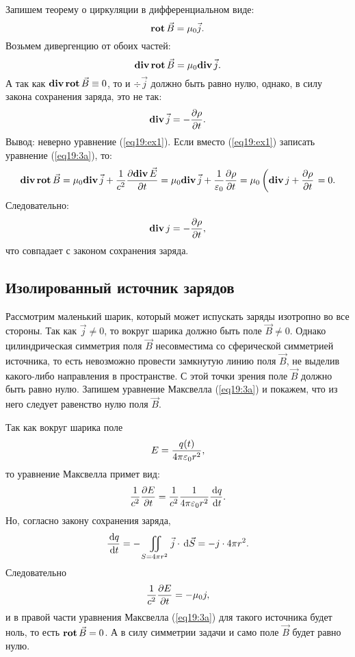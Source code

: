         Запишем теорему о циркуляции в дифференциальном виде:
        \begin{equation}
            \mathbf{rot\,}\vec{B} = \mu_0\vec{j}.
            \label{eq19:ex1}
        \end{equation}
        Возьмем дивергенцию от обоих частей:
        \[
            \mathbf{div\,}\mathbf{rot\,}\vec{B} = \mu_0\mathbf{div\,}\vec{j}.
        \]
        А так как \( \mathbf{div\,}\mathbf{rot\,}\vec{B} \equiv 0 \), то и \( \div\vec{j} \) должно
        быть равно нулю, однако, в силу закона сохранения заряда, это не так:
        \[
            \mathbf{div\,}\vec{j} = -\frac{\partial \rho}{\partial t}.
        \]
        Вывод: неверно уравнение (\ref{eq19:ex1}). Если вместо (\ref{eq19:ex1})
        записать уравнение (\ref{eq19:3a}), то:
        \[
            \mathbf{div\,}\mathbf{rot\,}\vec{B} = \mu_0\mathbf{div\,}\vec{j} +
            \frac{1}{c^2}\frac{\partial \mathbf{div\,}\vec{E}}{\partial t} = \mu_0\mathbf{div\,}\vec{j} +
            \frac{1}{\varepsilon_0}\frac{\partial \rho}{\partial t} = \mu_0\left(\mathbf{div\,}{j} +
            \frac{\partial \rho}{\partial t}\right. = 0.
        \]
        Следовательно:
        \[
            \mathbf{div\,}{j} = -\frac{\partial \rho}{\partial t},
        \]
        что совпадает с законом сохранения заряда.

    \subsection{Изолированный источник зарядов}

        Рассмотрим маленький шарик, который может испускать заряды изотропно во
        все стороны. Так как \( \vec{j} \ne 0 \), то вокруг шарика должно быть
        поле \( \vec{B} \ne 0 \). Однако цилиндрическая симметрия поля
        \( \vec{B} \) несовместима со сферической симметрией источника, то есть
        невозможно провести замкнутую линию поля \( \vec{B} \), не выделив
        какого-либо направления в пространстве. С этой точки зрения поле
        \( \vec{B} \) должно быть равно нулю. Запишем уравнение Максвелла
        (\ref{eq19:3a}) и покажем, что из него следует равенство нулю поля
        \( \vec{B} \).
        
        Так как вокруг шарика поле
        \[
            E = \frac{q(t)}{4\pi\varepsilon_0 r^2},
        \]
        то уравнение Максвелла примет вид:
        \[
            \frac{1}{c^2}\frac{\partial E}{\partial t} =
            \frac{1}{c^2}\frac{1}{4\pi\varepsilon_0 r^2}\frac{\,\mathrm{d} q}{\,\mathrm{d} t}.
        \]
        Но, согласно закону сохранения заряда,
        \[
            \frac{\,\mathrm{d} q}{\,\mathrm{d} t} =
            -\iint\limits_{S = 4\pi r^2} \vec{j}\cdot\,\mathrm{d}\vec{S} =
            -j\cdot4\pi r^2.
        \]
        Следовательно
        \[
            \frac{1}{c^2}\frac{\partial E}{\partial t} = -\mu_0j,
        \]
        и в правой части уравнения Максвелла (\ref{eq19:3a}) для такого
        источника будет ноль, то есть \( \mathbf{rot\,}\vec{B} = 0 \). А в силу симметрии
        задачи и само поле \( \vec{B} \) будет равно нулю.

